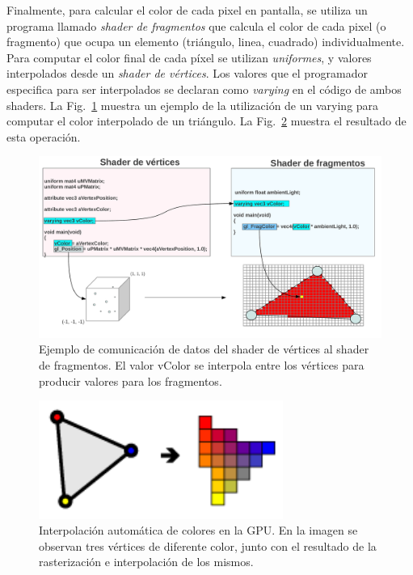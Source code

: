 Finalmente, para calcular el color de cada pixel en pantalla, se utiliza un programa llamado \emph{shader de fragmentos} que calcula el color de cada pixel (o fragmento) que ocupa un elemento (triángulo, linea, cuadrado) individualmente.
Para computar el color final de cada píxel se utilizan \emph{uniformes}, y valores interpolados desde un \emph{shader de vértices}.
Los valores que el programador especifica para ser interpolados se declaran como \emph{varying} en el código de ambos shaders.
La Fig.~\ref{fg:fragmentshader} muestra un ejemplo de la utilización de un varying para computar el color interpolado de un triángulo.
La Fig.~\ref{fg:interpolation} muestra el resultado de esta operación.


\begin{figure}[h]
\begin{center}
\includegraphics[width=13cm]{figures/fragmentshader}
\end{center}
\caption{Ejemplo de comunicación de datos del shader de vértices al shader de fragmentos. El valor vColor se interpola entre los vértices para producir valores para los fragmentos.}
\label{fg:fragmentshader}
\end{figure}

\begin{figure}[h]
\begin{center}
\includegraphics[width=8cm]{figures/interpolation}
\end{center}
\caption[Interpolación automática de colores en la GPU.]{Interpolación automática de colores en la GPU. En la imagen se observan tres vértices de diferente color, junto con el resultado de la rasterización e interpolación de los mismos.}
\label{fg:interpolation}
\end{figure}

